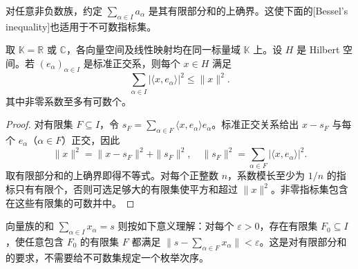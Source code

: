 对任意非负数族，约定 \(\sum_{\alpha\in I}a_\alpha\) 是其有限部分和的上确界。这使下面的[Bessel's inequality]也适用于不可数指标集。

\begin{proposition}[Bessel]\label{b1:prop:bessel-inequality}
取 \(\mathbb K=\mathbb R\) 或 \(\mathbb C\)，各向量空间及线性映射均在同一标量域 \(\mathbb K\) 上。设 \(H\) 是 Hilbert 空间。若 \((e_\alpha)_{\alpha\in I}\) 是标准正交系，则每个 \(x\in H\) 满足
\[
\sum_{\alpha\in I}|\langle x,e_\alpha\rangle|^2\leq\|x\|^2.
\]
其中非零系数至多有可数个。
\end{proposition}
\begin{proof}
对有限集 \(F\subseteq I\)，令 \(s_F=\sum_{\alpha\in F}\langle x,e_\alpha\rangle e_\alpha\)。标准正交关系给出 \(x-s_F\) 与每个 \(e_\alpha\)（\(\alpha\in F\)）正交，因此
\[
\|x\|^2=\|x-s_F\|^2+\|s_F\|^2,
\quad
\|s_F\|^2=\sum_{\alpha\in F}|\langle x,e_\alpha\rangle|^2.
\]
取有限部分和的上确界即得不等式。对每个正整数 \(n\)，系数模长至少为 \(1/n\) 的指标只有有限个，否则可选足够大的有限集使平方和超过 \(\|x\|^2\)。非零指标集包含在这些有限集的可数并中。
\end{proof}

向量族的和 \(\sum_{\alpha\in I}x_\alpha=s\) 则按如下意义理解：对每个 \(\varepsilon>0\)，存在有限集 \(F_0\subseteq I\)，使任意包含 \(F_0\) 的有限集 \(F\) 都满足 \(\|s-\sum_{\alpha\in F}x_\alpha\|<\varepsilon\)。这是对有限部分和的要求，不需要给不可数集规定一个枚举次序。

